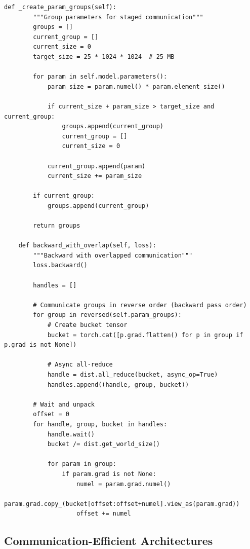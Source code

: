 \begin{lstlisting}[style=python, caption=Overlap communication with computation]
    def _create_param_groups(self):
        """Group parameters for staged communication"""
        groups = []
        current_group = []
        current_size = 0
        target_size = 25 * 1024 * 1024  # 25 MB

        for param in self.model.parameters():
            param_size = param.numel() * param.element_size()

            if current_size + param_size > target_size and current_group:
                groups.append(current_group)
                current_group = []
                current_size = 0

            current_group.append(param)
            current_size += param_size

        if current_group:
            groups.append(current_group)

        return groups

    def backward_with_overlap(self, loss):
        """Backward with overlapped communication"""
        loss.backward()

        handles = []

        # Communicate groups in reverse order (backward pass order)
        for group in reversed(self.param_groups):
            # Create bucket tensor
            bucket = torch.cat([p.grad.flatten() for p in group if p.grad is not None])

            # Async all-reduce
            handle = dist.all_reduce(bucket, async_op=True)
            handles.append((handle, group, bucket))

        # Wait and unpack
        offset = 0
        for handle, group, bucket in handles:
            handle.wait()
            bucket /= dist.get_world_size()

            for param in group:
                if param.grad is not None:
                    numel = param.grad.numel()
                    param.grad.copy_(bucket[offset:offset+numel].view_as(param.grad))
                    offset += numel
\end{lstlisting}

\subsection{Communication-Efficient Architectures}


